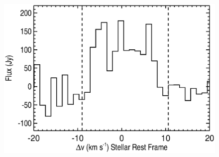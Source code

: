 \documentclass[iop]{emulateapj}
\begin{document}
\begin{figure}[hbt!]
\centering
\includegraphics[trim=60pt 0pt 0pt 0pt, scale=0.6]{sofia_spec_aj.eps}
\caption{}
\label{fig:fig8}
\end{figure}
\end{document}
